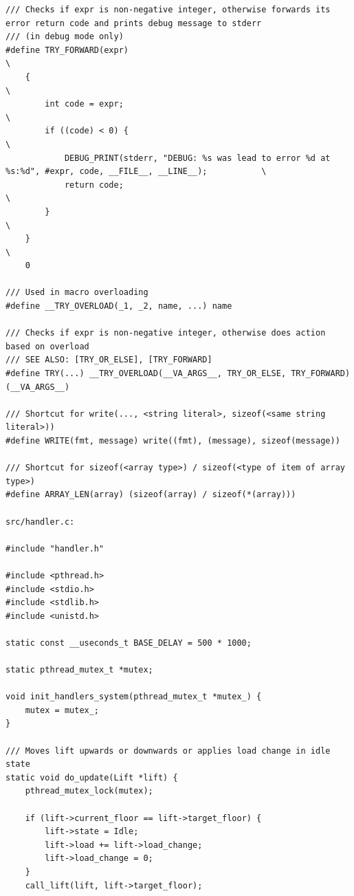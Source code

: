 \begin{verbatim}
/// Checks if expr is non-negative integer, otherwise forwards its error return code and prints debug message to stderr
/// (in debug mode only)
#define TRY_FORWARD(expr)                                                                                              \
    {                                                                                                                  \
        int code = expr;                                                                                               \
        if ((code) < 0) {                                                                                              \
            DEBUG_PRINT(stderr, "DEBUG: %s was lead to error %d at %s:%d", #expr, code, __FILE__, __LINE__);           \
            return code;                                                                                               \
        }                                                                                                              \
    }                                                                                                                  \
    0

/// Used in macro overloading
#define __TRY_OVERLOAD(_1, _2, name, ...) name

/// Checks if expr is non-negative integer, otherwise does action based on overload
/// SEE ALSO: [TRY_OR_ELSE], [TRY_FORWARD]
#define TRY(...) __TRY_OVERLOAD(__VA_ARGS__, TRY_OR_ELSE, TRY_FORWARD)(__VA_ARGS__)

/// Shortcut for write(..., <string literal>, sizeof(<same string literal>))
#define WRITE(fmt, message) write((fmt), (message), sizeof(message))

/// Shortcut for sizeof(<array type>) / sizeof(<type of item of array type>)
#define ARRAY_LEN(array) (sizeof(array) / sizeof(*(array)))

src/handler.c:

#include "handler.h"

#include <pthread.h>
#include <stdio.h>
#include <stdlib.h>
#include <unistd.h>

static const __useconds_t BASE_DELAY = 500 * 1000;

static pthread_mutex_t *mutex;

void init_handlers_system(pthread_mutex_t *mutex_) {
    mutex = mutex_;
}

/// Moves lift upwards or downwards or applies load change in idle state
static void do_update(Lift *lift) {
    pthread_mutex_lock(mutex);

    if (lift->current_floor == lift->target_floor) {
        lift->state = Idle;
        lift->load += lift->load_change;
        lift->load_change = 0;
    }
    call_lift(lift, lift->target_floor);


\end{verbatim}
